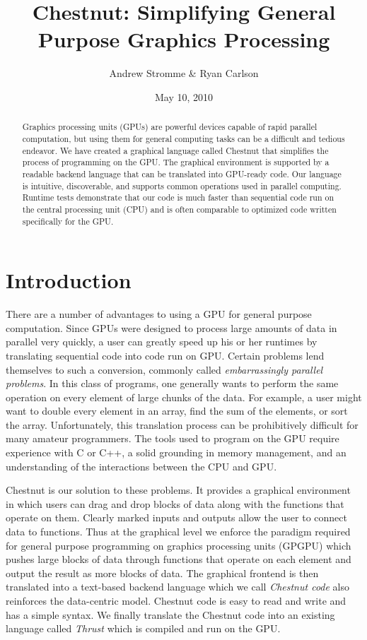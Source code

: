 \documentclass[twocolumn]{article}
\renewcommand{\|}{\origbar} %
\begin{document}
\title{Chestnut: Simplifying General Purpose Graphics Processing}
\author{Andrew Stromme \& Ryan Carlson}
\date{May 10, 2010}
\maketitle

\begin{abstract}
  Graphics processing units (GPUs) are powerful devices capable of rapid parallel computation, but using them for general computing tasks can be a difficult and tedious endeavor. We have created a graphical language called Chestnut that simplifies the process of programming on the GPU. The graphical environment is supported by a readable backend language that can be translated into GPU-ready code. Our language is intuitive, discoverable, and supports common operations used in parallel computing. Runtime tests demonstrate that our code is much faster than sequential code run on the central processing unit (CPU) and is often comparable to optimized code written specifically for the GPU.
\end{abstract}

\section{Introduction}

There are a number of advantages to using a GPU for general purpose computation. Since GPUs were designed to process large amounts of data in parallel very quickly, a user can greatly speed up his or her runtimes by translating sequential code into code run on GPU. Certain problems lend themselves to such a conversion, commonly called {\em embarrassingly parallel problems}. In this class of programs, one generally wants to perform the same operation on every element of large chunks of the data. For example, a user might want to double every element in an array, find the sum of the elements, or sort the array. Unfortunately, this translation process can be prohibitively difficult for many amateur programmers. The tools used to program on the GPU require experience with C or C++, a solid grounding in memory management, and an understanding of the interactions between the CPU and GPU. 

Chestnut is our solution to these problems. It provides a graphical environment in which users can drag and drop blocks of data along with the functions that operate on them. Clearly marked inputs and outputs allow the user to connect data to functions. Thus at the graphical level we enforce the paradigm required for general purpose programming on graphics processing units (GPGPU) which pushes large blocks of data through functions that operate on each element and output the result as more blocks of data. The graphical frontend is then translated into a text-based backend language which we call {\em Chestnut code} also reinforces the data-centric model. Chestnut code is easy to read and write and has a simple syntax. We finally translate the Chestnut code into an existing language called {\em Thrust} which is compiled and run on the GPU.
\end{document}
